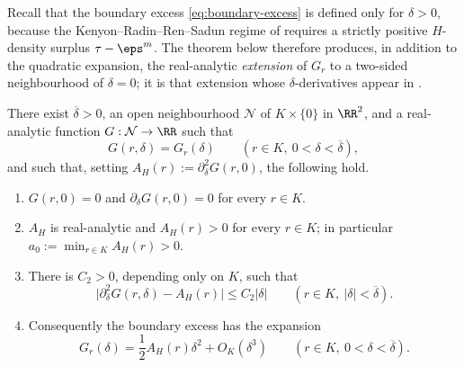 Recall that the boundary excess \eqref{eq:boundary-excess} is defined only for
$\delta>0$, because the Kenyon--Radin--Ren--Sadun regime of 
requires a strictly positive $H$-density surplus $\tau-\eps^m$.  The theorem
below therefore produces, in addition to the quadratic expansion, the
real-analytic \emph{extension} of $G_r$ to a two-sided neighbourhood of
$\delta=0$; it is that extension whose $\delta$-derivatives appear in
.

\begin{theorem}\label{thm:positive-second-variation}
There exist $\overline\delta>0$, an open neighbourhood $\mathcal N$ of
$K\times\{0\}$ in $\RR^2$, and a real-analytic function
$G:\mathcal N\to\RR$ such that
\begin{equation}\label{eq:boundary-excess-extension}
  G(r,\delta)=G_r(\delta)
  \qquad(r\in K,\ 0<\delta<\overline\delta),
\end{equation}
and such that, setting $A_H(r):=\partial_\delta^2G(r,0)$, the following hold.
\begin{enumerate}[label=(\roman*)]
  \item $G(r,0)=0$ and $\partial_\delta G(r,0)=0$ for every $r\in K$.
  \item $A_H$ is real-analytic and $A_H(r)>0$ for every $r\in K$; in
  particular $a_0:=\min_{r\in K}A_H(r)>0$.
  \item There is $C_2>0$, depending only on $K$, such that
  \begin{equation}\label{eq:boundary-excess-curvature}
    \bigl|\partial_\delta^2G(r,\delta)-A_H(r)\bigr|\le C_2|\delta|
    \qquad(r\in K,\ |\delta|<\overline\delta).
  \end{equation}
  \item Consequently the boundary excess has the expansion
  \begin{equation}\label{eq:boundary-excess-expansion}
    G_r(\delta)=\frac12A_H(r)\delta^2+O_K(\delta^3)
    \qquad(r\in K,\ 0<\delta<\overline\delta).
  \end{equation}
\end{enumerate}
\end{theorem}


